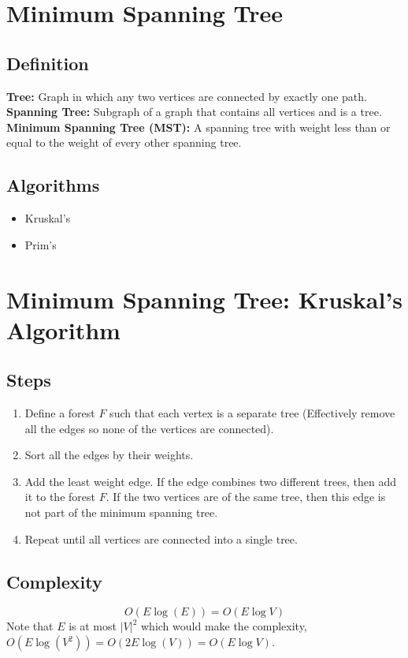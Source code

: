 \section{Minimum Spanning Tree}

\subsection{Definition}
\textbf{Tree: } Graph in which any two vertices are connected by exactly one path.\\
\textbf{Spanning Tree: } Subgraph of a graph that contains all vertices and is a tree.\\
\textbf{Minimum Spanning Tree (MST): } A spanning tree with weight less than or equal to the weight of every other spanning tree. 

\subsection{Algorithms}
\begin{itemize}
	\item Kruskal's
	\item Prim's
\end{itemize}

\newpage

\section{Minimum Spanning Tree: Kruskal's Algorithm}

\subsection*{Steps}
\begin{enumerate}
	\item Define a forest $F$ such that each vertex is a separate tree (Effectively remove all the edges so none of the vertices are connected).
	\item Sort all the edges by their weights.
	\item Add the least weight edge. If the edge combines two different trees, then add it to the forest $F$. If the two vertices are of the same tree, then this edge is not part of the minimum spanning tree.
	\item Repeat until all vertices are connected into a single tree.
\end{enumerate}

\subsection*{Complexity}
$$
O(E \log(E)) = O(E \log V)
$$
Note that $E$ is at most $\vert V \vert^2$ which would make the complexity, $O(E \log(V^2)) = O(2E \log(V)) = O(E \log V)$.

